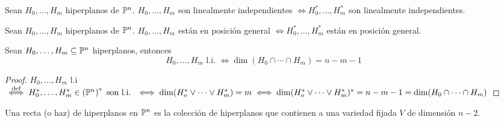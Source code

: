 \begin{defi}
    Sean $H_0, \dots, H_m$ hiperplanos de $\mathbb{P}^n$. $H_0, \dots, H_m$ son linealmente independientes $\iff H_0^*, \dots, H_m^*$ son linealmente independientes.
\end{defi}
\begin{defi}
    Sean $H_0, \dots, H_m$ hiperplanos de $\mathbb{P}^n$. $H_0, \dots, H_m$ están en posición general $\iff H_0^*, \dots, H_m^*$ están en posición general.
\end{defi}

\begin{prop}
    Sean $H_0,\dots,H_m \subseteq \mathbb{P}^n$ hiperplanos, entonces
    \[
        H_0,\dots, H_m \text{ l.i. } \iff \dim(H_0 \cap \cdots \cap H_m) = n - m - 1
    \]
\end{prop}
\begin{proof}
    $H_0,\dots,H_m$ l.i $\stackrel{\text{def}}{\iff} H_0^*,\dots,H_m^* \in \left(\mathbb{P}^n\right)^* \text{ son l.i. }
    \iff \dim(H_o^* \vee \cdots \vee H_m^*) = m \iff \dim(H_o^* \vee \cdots \vee H_m^*)^* = n - m-1
    = \dim(H_0 \cap \cdots \cap H_m)$
\end{proof}

\begin{defi}
    Una recta (o haz) de hiperplanos en $\mathbb{P}^n$ es la colección de hiperplanos que contienen a una variedad
    fijada $V$ de dimensión $n-2$.
\end{defi}


